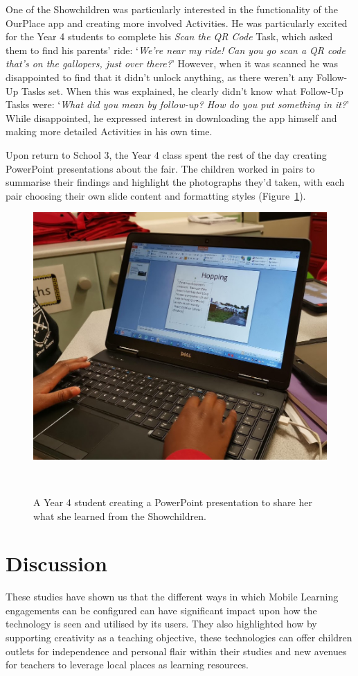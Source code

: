 \documentclass[,hyphens]{sigchi}
\begin{document}
One of the Showchildren was particularly interested in the functionality of the OurPlace app and creating more involved Activities. He was particularly excited for the Year 4 students to complete his \textit{Scan the QR Code} Task, which asked them to find his parents' ride: `\textit{We're near my ride! Can you go scan a QR code that's on the gallopers, just over there?}' However, when it was scanned he was disappointed to find that it didn't unlock anything, as there weren't any Follow-Up Tasks set. When this was explained, he clearly didn't know what Follow-Up Tasks were: `\textit{What did you mean by follow-up? How do you put something in it?}' While disappointed, he expressed interest in downloading the app himself and making more detailed Activities in his own time.

Upon return to School 3, the Year 4 class spent the rest of the day creating PowerPoint presentations about the fair. The children worked in pairs to summarise their findings and highlight the photographs they'd taken, with each pair choosing their own slide content and formatting styles (Figure~\ref{fig:Laptop}). 

\begin{figure}
\centering
  \includegraphics[width=1\columnwidth]{figures/laptop}
  \caption{ A Year 4 student creating a PowerPoint presentation to share her what she learned from the Showchildren. }~\label{fig:Laptop}
\end{figure}

\section{Discussion}
These studies have shown us that the different ways in which Mobile Learning engagements can be configured can have significant impact upon how the technology is seen and utilised by its users. They also highlighted how by supporting creativity as a teaching objective, these technologies can offer children outlets for independence and personal flair within their studies and new avenues for teachers to leverage local places as learning resources.
\end{document}
